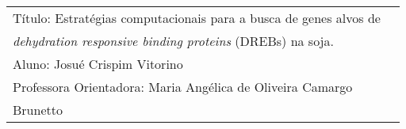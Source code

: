 
\begin{center}


\begin{tabular}{l|l}
\hline
T\'itulo: Estratégias computacionais para a busca de genes alvos de \\ \textit{ dehydration responsive binding proteins} (DREBs) na soja. \\ 

\hline
Aluno: Josué Crispim Vitorino \\ 
\hline
Professora Orientadora:  Maria Ang\'elica de Oliveira Camargo\\ Brunetto \\ 
\hline
\end{tabular}\\


\end{center}
